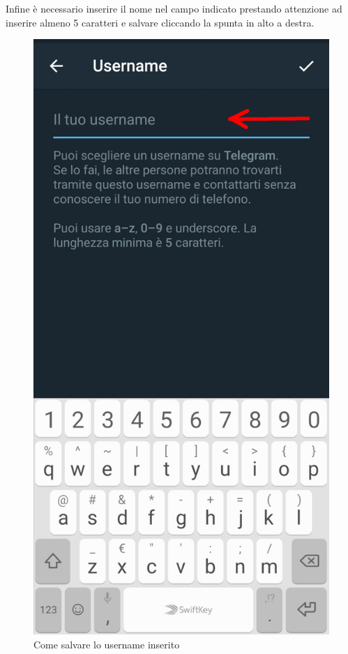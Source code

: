 	Infine è necessario inserire il nome nel campo indicato prestando attenzione ad inserire almeno 5 caratteri e salvare cliccando la spunta in alto a destra.
	\begin{figure}[H]
		\centering
		\includegraphics[scale=0.100]{res/images/telegram3.jpg}
		\caption{Come salvare lo username inserito}
		\label{Screenshot3}
	\end{figure}

